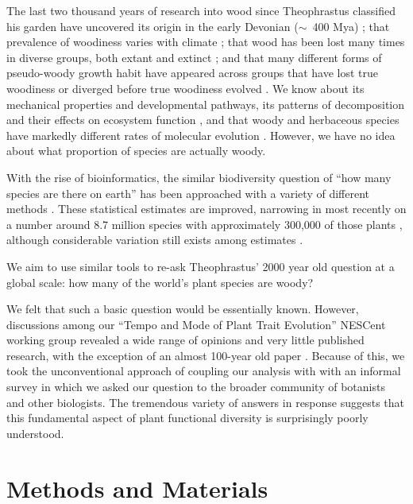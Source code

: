 \documentclass[12pt]{article}
\begin{document}
The last two thousand years of research into wood since Theophrastus
classified his garden have uncovered its origin in the early Devonian
($\sim$~400 Mya) \citep{gerrienne2011simple}; that prevalence of
woodiness varies with climate \citep{Molesheihgt}; that wood has been
lost many times in diverse groups, both extant and extinct
\citep{judd1994}; and that many different forms of pseudo-woody growth
habit have appeared across groups that have lost true woodiness or
diverged before true woodiness evolved \citep{Cornwellwood}.  We know
about its mechanical properties and developmental pathways, its
patterns of decomposition and their effects on ecosystem function
\citep{Cornwellwood}, and that woody and herbaceous species have
markedly different rates of molecular evolution \citep{SmithDonoghue}.
%
However, we have no idea about what proportion of species are actually
woody.

With the rise of bioinformatics, the similar biodiversity question of
``how many species are there on earth'' has been approached with a
variety of different methods \citep{may1988many,erwin1991many,
  stork1993many, joppa2010, costello2011, mora2011plos}.  These
statistical estimates are improved, narrowing in most recently on a
number around 8.7 million species with approximately 300,000 of those
plants \citep{mora2011plos}, although considerable variation still
exists among estimates \citep{costello2011}.

We aim to use similar tools to re-ask Theophrastus' 2000 year old
question at a global scale: how many of the world's plant species are
woody?

We felt that such a basic question would be essentially known.
%
However, discussions among our ``Tempo and Mode of Plant Trait
Evolution'' NESCent working group revealed a wide range of opinions
and very little published research, with the exception of an almost
100-year old paper \citep{sinnott1915evolution}.
%
Because of this, we took the unconventional approach of coupling our
analysis with with an informal survey in which we asked our question
to the broader community of botanists and other biologists.
% 
The tremendous variety of answers in response suggests that this
fundamental aspect of plant functional diversity is surprisingly
poorly understood.

\section{Methods and Materials}
\end{document}
